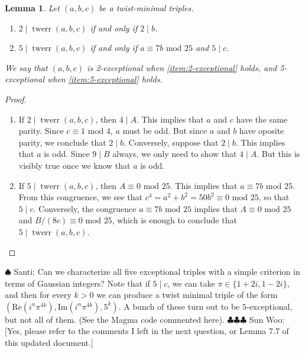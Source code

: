 \documentclass[12pt]{amsart}
\newcounter{counter}[section] %
\numberwithin{equation}{section} %
\newtheorem{lemma}[counter]{Lemma}
\theoremstyle{definition} \newtheorem{definition}[counter]{Definition}
\theoremstyle{remark} \newtheorem{nonexam}[counter]{Non-example}
\newcommand{\md}{\text{ mod }} %
\newcommand{\cdef}[1]{\textsf{#1}} %
\renewcommand{\Re}{\mathrm{Re}} %
\renewcommand{\Im}{\mathrm{Im}} %
\newcommand{\santi}[1]{{\color{cyan} \sf
    $\spadesuit$ Santi: #1}}
\newcommand{\spark}[1]{{\color{olive} \sf
    $\clubsuit\clubsuit\clubsuit$ Sun Woo: [#1]}}
\DeclareMathOperator{\twerr}{twerr} %
\begin{document}
\begin{lemma}
  \label{lemma:exceptional-triples}
  Let $(a,b,c)$ be a twist-minimal triples.
  \begin{enumerate}[label=(\alph*)]
  \item \label{item:2-exceptional} $2 \mid \twerr(a,b,c)$ if and only if $2 \mid b$.
  \item \label{item:5-exceptional} $5 \mid \twerr(a,b,c)$ if and only if $a \equiv 7b \md 25$ and $5
    \mid c$.
  \end{enumerate}
  We say that $(a,b,c)$ is \cdef{2-exceptional} when \ref{item:2-exceptional}
  holds, and \cdef{5-exceptional} when \ref{item:5-exceptional} holds.
\end{lemma}
\begin{proof}
  \hfill
  \begin{enumerate}[label=(\alph*)]
  \item If $2 \mid \twerr(a,b,c)$, then $4 \mid A$. This implies that $a$ and
    $c$ have the same parity. Since $c \equiv 1 \md 4$, $a$ must be odd. But
    since $a$ and $b$ have oposite parity, we conclude that $2 \mid b$.
    Conversely, suppose that $2 \mid b$. This implies that $a$ is odd. Since $9
    \mid B$ always, we only need to show that $4 \mid A$. But this is visibly
    true once we know that $a$ is odd.
  \item If $5 \mid \twerr(a,b,c)$, then $A \equiv 0 \md 25$. This implies that
    $a \equiv 7b \md 25$. From this congruence, we see that $c^4 = a^2 +
    b^2 = 50b^2 \equiv 0 \md 25$, so that $5 \mid c$. Conversely, the
    congruence $a \equiv 7b \md 25$ implies that $A \equiv 0 \md 25$ and $B/(8c)
    \equiv 0 \md 25$, which is enough to conclude that $5 \mid \twerr(a,b,c)$.
  \end{enumerate}
\end{proof}
\santi{Can we characterize all five exceptional triples with a simple criterion
  in terms of Gaussian integers? Note that if $5 \mid c$, we can take
  $\pi \in \{1 + 2i, 1-2i\}$, and then for every $k > 0$ we can produce a twist
  minimal triple of the form $(\Re(i^n\pi^{4k}), \Im(i^n\pi^{4k}), 5^k)$. A
  bunch of these turn out to be $5$-exceptional, but not all of them. (See the
  Magma code commented here)}. \spark{Yes, please refer to the comments I left
  in the next question, or Lemma 7.7 of this updated document.}


\end{document}
